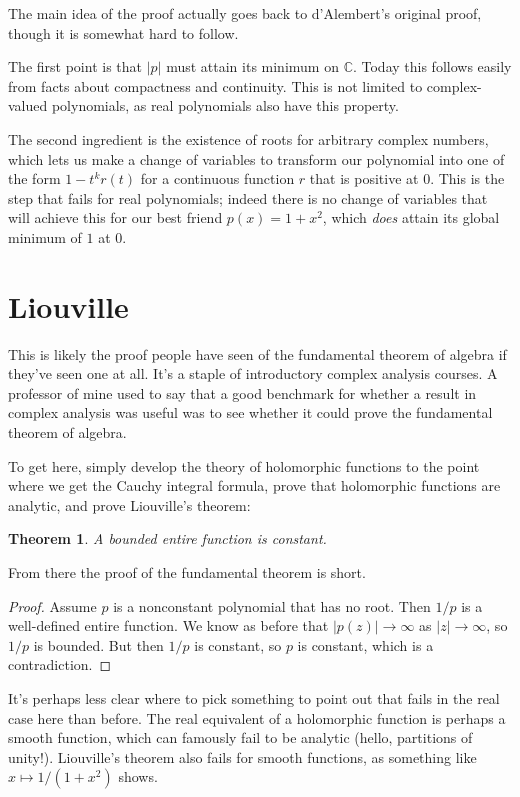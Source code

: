 \documentclass[11pt,draft]{article}
\newtheorem*{theo}{Theorem}
\newcommand{\kk}[1]{\mathbb{#1}}
\begin{document}
The main idea of the proof actually goes back to d'Alembert's original
proof, though it is somewhat hard to follow.

The first point is that $|p|$ must attain its minimum on $\kk C$. Today this
follows easily from facts about compactness and continuity. This is not limited
to complex-valued polynomials, as real polynomials also have this property.

The second ingredient is the existence of roots for arbitrary complex numbers,
which lets us make a change of variables to transform our polynomial into one of
the form $1 - t^k r(t)$ for a continuous function $r$ that is positive at $0$.
This is the step that fails for real polynomials; indeed there is no change of
variables that will achieve this for our best friend $p(x) = 1 + x^2$, which
\emph{does} attain its global minimum of $1$ at $0$.



\section{Liouville}

This is likely the proof people have seen of the fundamental theorem of algebra
if they've seen one at all. It's a staple of introductory complex analysis
courses. A professor of mine used to say that a good benchmark for whether a
result in complex analysis was useful was to see whether it could prove the
fundamental theorem of algebra.

To get here, simply develop the theory of holomorphic functions to the point
where we get the Cauchy integral formula, prove that holomorphic functions are
analytic, and prove Liouville's theorem:

\begin{theo}
A bounded entire function is constant.
\end{theo}

From there the proof of the fundamental theorem is short.

\begin{proof}
Assume $p$ is a nonconstant polynomial that has no root.
Then $1/p$ is a well-defined entire function.
We know as before that $|p(z)| \to \infty$ as $|z| \to \infty$, so $1/p$ is bounded.
But then $1/p$ is constant, so $p$ is constant, which is a contradiction.
\end{proof}

It's perhaps less clear where to pick something to point out that fails in the
real case here than before.
The real equivalent of a holomorphic function is perhaps a smooth function,
which can famously fail to be analytic (hello, partitions of unity!).
Liouville's theorem also fails for smooth functions, as something like $x
\mapsto 1/(1+x^2)$ shows.
\end{document}
